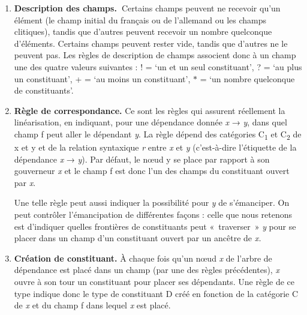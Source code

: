 {\begin{enumerate}
    La principale différence avec les règles de réécriture est qu’un constituant n’est pas réécrit en une liste de constituants, mais en une liste de champs, auxquels sont assignés des constituants par d’autres règles.

    \item \textbf{Description des champs.~}Certains champs peuvent ne recevoir qu’un élément (le champ initial du français ou de l’allemand ou les champs clitiques), tandis que d’autres peuvent recevoir un nombre quelconque d’éléments. Certains champs peuvent rester vide, tandis que d’autres ne le peuvent pas. Les règles de description de champs associent donc à un champ une des quatre valeurs suivantes : ! = ‘un et un seul constituant’, ? = ‘au plus un constituant’, + = ‘au moins un constituant’, \textrm{$*$} = ‘un nombre quelconque de constituants’.

    \item \textbf{Règle de correspondance.} Ce sont les règles qui assurent réellement la linéarisation, en indiquant, pour une dépendance donnée \textit{x} \textrm{→} \textit{y}, dans quel champ f peut aller le dépendant \textit{y}. La règle dépend des catégories C\textsubscript{1} et C\textsubscript{2} de x et y et de la relation syntaxique \textit{r} entre \textit{x} et \textit{y} (c’est-à-dire l’étiquette de la dépendance \textit{x} \textrm{→} \textit{y}). Par défaut, le nœud y se place par rapport à son gouverneur \textit{x} et le champ f est donc l’un des champs du constituant ouvert par \textit{x}.

    \ea {}
    \z

    Une telle règle peut aussi indiquer la possibilité pour \textit{y} de s’émanciper. On peut contrôler l’émancipation de différentes façons : celle que nous retenons est d’indiquer quelles frontières de constituants peut «~traverser~» \textit{y} pour se placer dans un champ d’un constituant ouvert par un ancêtre de \textit{x.}
    
    \ea {} \z

    \item \textbf{Création de constituant.} À chaque fois qu’un nœud \textit{x} de l’arbre de dépendance est placé dans un champ (par une des règles précédentes), \textit{x} ouvre à son tour un constituant pour placer ses dépendants. Une règle de ce type indique donc le type de constituant D créé en fonction de la catégorie C de \textit{x} et du champ f dans lequel \textit{x} est placé.


\end{enumerate}}
